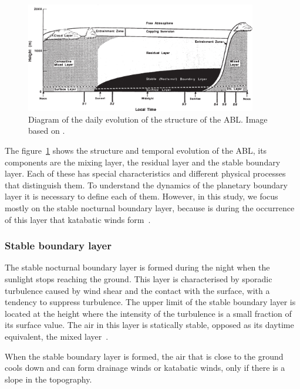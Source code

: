 \begin{figure}[ht!]
	\vspace{-5pt}
    \centering
\includegraphics[width=0.9\textwidth]{fig/abl_stull.png}
    \caption{Diagram of the daily evolution of the structure of the ABL. Image based on \cite{stull2012introduction}.}
    \label{fig:ABL_structure}
  \vspace{-5pt}
\end{figure}

The figure~\ref{fig:ABL_structure} shows the structure and temporal evolution of the ABL, its components are the mixing layer, the residual layer and the stable boundary layer. Each of these has special characteristics and different physical processes that distinguish them. To understand the dynamics of the planetary boundary layer it is necessary to define each of them. However, in this study, we focus mostly on the stable nocturnal boundary layer, because is during the occurrence of this layer that katabatic winds form~\citep{poulos2008observational, stull2012introduction}.

\subsubsection{Stable boundary layer}
The stable nocturnal boundary layer is formed during the night when the sunlight stops reaching the ground. This layer is characterised by sporadic turbulence caused by wind shear and the contact with the surface, with a tendency to suppress turbulence. The upper limit of the stable boundary layer is located at the height where the intensity of the turbulence is a small fraction of its surface value. The air in this layer is statically stable, opposed as its daytime equivalent, the mixed layer~\citep{stull2012introduction}.

When the stable boundary layer is formed, the air that is close to the ground cools down and can form drainage winds or katabatic winds, only if there is a slope in the topography.

